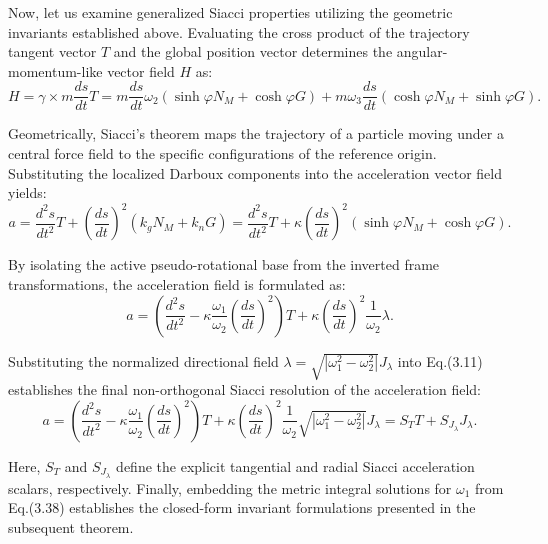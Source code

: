 \documentclass[reqno]{amsart}
\theoremstyle{plain}
\numberwithin{equation}{section}
\begin{document}
Now, let us examine generalized Siacci properties utilizing the geometric invariants established above. Evaluating the cross product of the trajectory tangent vector $T$ and the global position vector determines the angular-momentum-like vector field $H$ as:
\begin{equation}
H = \gamma \times m \frac{ds}{dt} T = m \frac{ds}{dt} \omega_{2} (\sinh\varphi N_{M} + \cosh\varphi G) + m \omega_{3} \frac{ds}{dt} (\cosh\varphi N_{M} + \sinh\varphi G). \tag{3.35}
\end{equation}

Geometrically, Siacci's theorem maps the trajectory of a particle moving under a central force field to the specific configurations of the reference origin. Substituting the localized Darboux components into the acceleration vector field yields:
\begin{equation}
a = \frac{d^{2}s}{dt^{2}} T + \left( \frac{ds}{dt} \right)^{2} (k_{g} N_{M} + k_{n} G) = \frac{d^{2}s}{dt^{2}} T + \kappa \left( \frac{ds}{dt} \right)^{2} (\sinh\varphi N_{M} + \cosh\varphi G). \tag{3.36}
\end{equation}

By isolating the active pseudo-rotational base from the inverted frame transformations, the acceleration field is formulated as:
\begin{equation}
a = \left( \frac{d^{2}s}{dt^{2}} - \kappa \frac{\omega_{1}}{\omega_{2}} \left( \frac{ds}{dt} \right)^{2} \right) T + \kappa \left( \frac{ds}{dt} \right)^{2} \frac{1}{\omega_{2}} \lambda. \tag{3.37}
\end{equation}

Substituting the normalized directional field $\lambda = \sqrt{\left| \omega_{1}^{2} - \omega_{2}^{2} \right|} J_{\lambda}$ into Eq.(3.11) establishes the final non-orthogonal Siacci resolution of the acceleration field:
\begin{equation}
a = \left( \frac{d^{2}s}{dt^{2}} - \kappa \frac{\omega_{1}}{\omega_{2}} \left( \frac{ds}{dt} \right)^{2} \right) T + \kappa \left( \frac{ds}{dt} \right)^{2} \frac{1}{\omega_{2}} \sqrt{\left| \omega_{1}^{2} - \omega_{2}^{2} \right|} J_{\lambda} = S_{T} T + S_{J_{\lambda}} J_{\lambda}. \tag{3.38}
\end{equation}

Here, $S_{T}$ and $S_{J_{\lambda}}$ define the explicit tangential and radial Siacci acceleration scalars, respectively. Finally, embedding the metric integral solutions for $\omega_{1}$ from Eq.(3.38) establishes the closed-form invariant formulations presented in the subsequent theorem.
\end{document}
